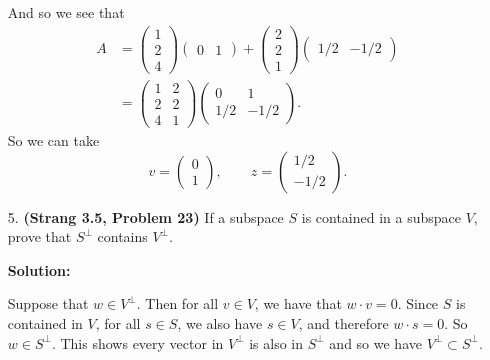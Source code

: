 \documentclass[11pt]{article}
\begin{document}
\begin{enumerate}
And so we see that 
\begin{align*}
A &= \begin{pmatrix} 1 \\ 2 \\ 4 \end{pmatrix} \begin{pmatrix} 0 & 1 \end{pmatrix} + \begin{pmatrix} 2 \\ 2 \\ 1 \end{pmatrix} \begin{pmatrix} 1/2 & -1/2 \end{pmatrix} \\
&= \begin{pmatrix} 1 & 2 \\ 2 & 2 \\ 4 & 1 \end{pmatrix}\begin{pmatrix} 0 & 1 \\ 1/2 & -1/2\end{pmatrix}.
\end{align*}
So we can take
\[v = \begin{pmatrix} 0 \\ 1 \end{pmatrix}, \qquad z = \begin{pmatrix} 1/2 \\ -1/2 \end{pmatrix}. \]





\item[5.]  \textbf{(Strang 3.5, Problem 23)} If a subspace $S$ is contained in a subspace $V$, prove that $S^\perp$ contains $V^\perp$.

\textbf{Solution:}

Suppose that $w \in V^\perp$.  Then for all $v \in V$, we have that $w \cdot v = 0$.  Since $S$ is contained in $V$, for all $s \in S$, we also have $s \in V$, and therefore $w \cdot s = 0$.  So $w \in S^\perp$.  This shows every vector in $V^\perp$ is also in $S^\perp$ and so we have $V^\perp \subset S^\perp$.













\end{enumerate}
\end{document}
